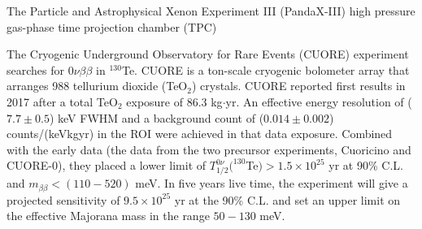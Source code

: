 The Particle and Astrophysical Xenon Experiment III (PandaX-III) 
high pressure gas-phase time projection chamber (TPC)  




The Cryogenic Underground Observatory for Rare Events (CUORE) experiment searches for $0\nu\beta\beta$ in $^{130}$Te. CUORE is a ton-scale cryogenic bolometer array that arranges 988 tellurium dioxide (TeO$_2$) crystals. CUORE reported first results in 2017 after a total TeO$_2$ exposure of 86.3 kg$\cdot$yr. An effective energy resolution of ($7.7\pm 0.5$) keV FWHM and a background count of ($0.014\pm0.002$) counts/(keVkgyr) in the ROI were achieved in that data exposure. Combined with the early data (the data from the two precursor experiments, Cuoricino and CUORE-0), they placed a lower limit of $T^{0\nu}_{1/2}(^{130}$Te$)>1.5\times 10^{25}$ yr at 90\% C.L. and $m_{\beta\beta}<(110-520)$  meV\cite{alduino2018first}. In five years live time, the experiment will give a projected sensitivity of $9.5\times 10^{25}$ yr at the 90\% C.L. and set an upper limit on the effective Majorana mass in the range $50-130$ meV\cite{piperno2015dark}.


